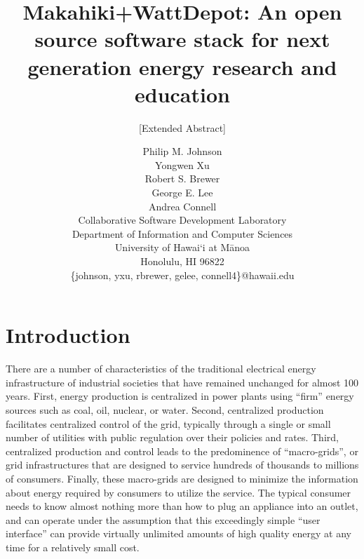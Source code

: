 \documentclass{acm_proc_article-sp}
\begin{document}
\title{Makahiki+WattDepot: An open source software stack for 
next generation energy research and education}
\subtitle{[Extended Abstract]}

\author{Philip M. Johnson\\
        Yongwen Xu\\
        Robert S. Brewer\\
        George E. Lee\\
        Andrea Connell\\
        Collaborative Software Development Laboratory\\
        Department of Information and Computer Sciences\\
        University of Hawai`i at M\=anoa\\
        Honolulu, HI 96822\\
        \{johnson, yxu, rbrewer, gelee, connell4\}@hawaii.edu\\
}


\maketitle

\section{Introduction}

There are a number of characteristics of the traditional electrical energy infrastructure
of industrial societies that have remained unchanged for almost 100 years.  First, energy
production is centralized in power plants using ``firm'' energy sources such as coal, oil,
nuclear, or water.  Second, centralized production
facilitates centralized control of the grid, typically through a single or small number of
utilities with public regulation over their policies and rates.  Third, centralized
production and control leads to the predominence of ``macro-grids'', or grid
infrastructures that are designed to service hundreds of thousands to millions of
consumers. Finally, these macro-grids are designed to minimize the information about
energy required by consumers to utilize the service.  The typical consumer needs to know
almost nothing more than how to plug an appliance into an outlet, and can operate under the
assumption that this exceedingly simple ``user interface'' can provide virtually unlimited
amounts of high quality energy at any time for a relatively small cost.
\end{document}
